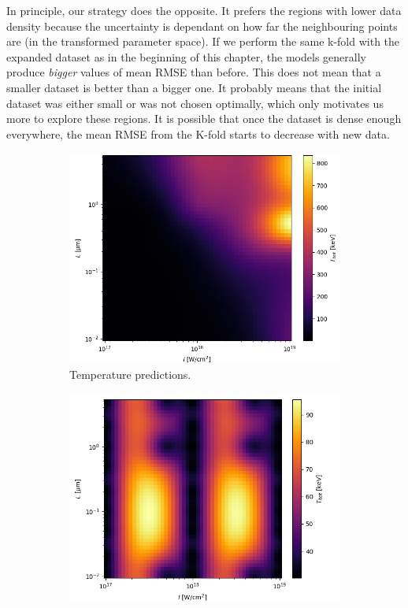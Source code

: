 In principle, our strategy does the opposite. It prefers the regions with lower data density because the uncertainty is dependant on how far the neighbouring points are (in the transformed parameter space). If we perform the same k-fold with the expanded dataset as in the beginning of this chapter, the models generally produce \textit{bigger} values of mean RMSE than before. This does not mean that a smaller dataset is better than a bigger one. It probably means that the initial dataset was either small or was not chosen optimally, which only motivates us more to explore these regions. It is possible that once the dataset is dense enough everywhere, the mean RMSE from the K-fold starts to decrease with new data.


\begin{figure}[ht]
	\centering
	\begin{subfigure}{0.49\textwidth}
		\centering
		\includegraphics[width=\textwidth]{figures/improved-model}
		\caption{Temperature predictions.}
		\label{fig:gp-improved-pred}
	\end{subfigure}
	\hfill
	\begin{subfigure}{0.49\textwidth}
		\centering
		\includegraphics[width=\textwidth]{figures/improved-model-ss}

\end{subfigure}
\end{figure}
